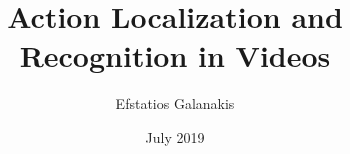 \documentclass[diploma]{softlab-thesis}
\begin{document}

\frontmatter

\title{Action Localization and Recognition in Videos}
\author{Efstatios Galanakis}
\date{July 2019}

\supervisor{}
\supervisorpos{}

\committeeone{}
\committeeonepos{}
\committeetwo{}
\committeetwopos{}
\committeethree{}
\committeethreepos{}

\department{}

\maketitle



\end{document}
